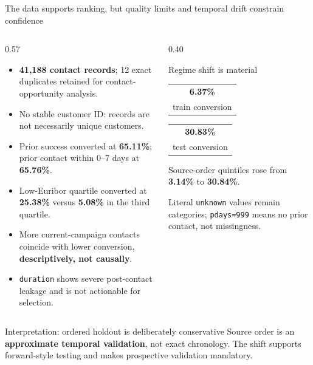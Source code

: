\documentclass[aspectratio=169,11pt]{beamer}
\newcommand{\metric}[2]{\begin{tabular}{c}\Large\textbf{#1}\\[-0.2em]{\scriptsize #2}\end{tabular}}
\newcommand{\tightitem}{\setlength\itemsep{0.25em}}
\begin{document}
\begin{frame}{The data supports ranking, but quality limits and temporal drift constrain confidence}
\begin{columns}[T,totalwidth=\textwidth]
\begin{column}{0.57\textwidth}
\begin{itemize}\tightitem
  \item \textbf{41,188 contact records}; 12 exact duplicates retained for contact-opportunity analysis.
  \item No stable customer ID: records are not necessarily unique customers.
  \item Prior success converted at \textbf{65.11\%}; prior contact within 0--7 days at \textbf{65.76\%}.
  \item Low-Euribor quartile converted at \textbf{25.38\%} versus \textbf{5.08\%} in the third quartile.
  \item More current-campaign contacts coincide with lower conversion, \textbf{descriptively, not causally}.
  \item \texttt{duration} shows severe post-contact leakage and is not actionable for selection.
\end{itemize}
\end{column}
\begin{column}{0.40\textwidth}
\begin{block}{Regime shift is material}
\centering
\metric{6.37\%}{train conversion}\quad
\metric{30.83\%}{test conversion}

\vspace{0.7em}
\small Source-order quintiles rose from \textbf{3.14\%} to \textbf{30.84\%}.
\end{block}
\vspace{0.4em}
\small Literal \texttt{unknown} values remain categories; \texttt{pdays=999} means no prior contact, not missingness.
\end{column}
\end{columns}

\vspace{0.5em}
\begin{block}{Interpretation: ordered holdout is deliberately conservative}
Source order is an \textbf{approximate temporal validation}, not exact chronology. The shift supports forward-style testing and makes prospective validation mandatory.
\end{block}
\end{frame}
\end{document}
